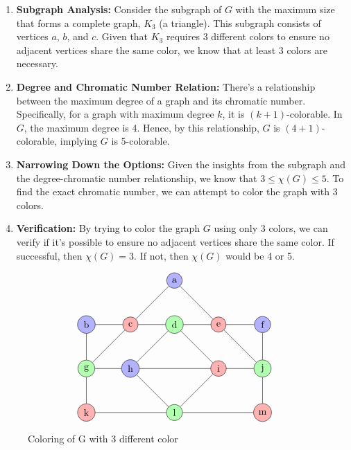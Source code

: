 \documentclass[12pt]{article}
\begin{document}
\begin{enumerate}
    \item \textbf{Subgraph Analysis:} Consider the subgraph of \( G \) with the maximum size that forms a complete graph, \( K_3 \) (a triangle). This subgraph consists of vertices \( a \), \( b \), and \( c \). Given that \( K_3 \) requires 3 different colors to ensure no adjacent vertices share the same color, we know that at least 3 colors are necessary.
    
    \item \textbf{Degree and Chromatic Number Relation:} There's a relationship between the maximum degree of a graph and its chromatic number. Specifically, for a graph with maximum degree \( k \), it is \( (k+1) \)-colorable. In \( G \), the maximum degree is 4. Hence, by this relationship, \( G \) is \( (4+1) \)-colorable, implying \( G \) is 5-colorable.
    
    \item \textbf{Narrowing Down the Options:} Given the insights from the subgraph and the degree-chromatic number relationship, we know that \( 3 \leq \chi(G) \leq 5 \). To find the exact chromatic number, we can attempt to color the graph with 3 colors.
    
    \item \textbf{Verification:} By trying to color the graph \( G \) using only 3 colors, we can verify if it's possible to ensure no adjacent vertices share the same color. If successful, then \( \chi(G) = 3 \). If not, then \( \chi(G) \) would be 4 or 5.
\end{enumerate}

\begin{figure}[H] 
    \[
\begin{tikzpicture}[scale=0.8]
    \node[circle,draw,fill=blue!30] (a) at (0,4) {a};
    \node[circle,draw,fill=blue!30] (b) at (-4,2) {b};
    \node[circle,draw,fill=red!30] (c) at (-2,2) {c};
    \node[circle,draw,fill=green!30] (d) at (0,2) {d};
    \node[circle,draw,fill=red!30] (e) at (2,2) {e};
    \node[circle,draw,fill=blue!30] (f) at (4,2) {f};
    \node[circle,draw,fill=green!30] (g) at (-4,0) {g};
    \node[circle,draw,fill=blue!30] (h) at (-2,0) {h};
    \node[circle,draw,fill=red!30] (i) at (2,0) {i};
    \node[circle,draw,fill=green!30] (j) at (4,0) {j};
    \node[circle,draw,fill=red!30] (k) at (-4,-2) {k};
    \node[circle,draw,fill=green!30] (l) at (0,-2) {l};
    \node[circle,draw,fill=red!30] (m) at (4,-2) {m};
    \draw (a) -- (e) -- (j);
    \draw (a) -- (c) -- (g);
    \draw (d) -- (h) -- (l) -- (i) -- (d);
    \draw (b) -- (g) -- (k);
    \draw (f) -- (j) -- (m);
    \draw (b) -- (c) -- (d) -- (e) -- (f);
    \draw (g) -- (h) -- (i) -- (j);
    \draw (k) -- (l) -- (m);
\end{tikzpicture}
\]
\caption{Coloring of G with 3 different color}
\end{figure}
\end{document}
